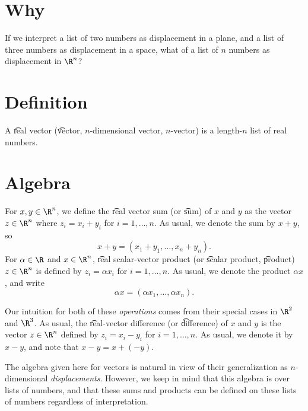 

\section*{Why}

If we interpret a list of two numbers as displacement in a plane, and a list of three numbers as displacement in a space, what of a list of $n$ numbers as displacement in $\R ^n$?

\section*{Definition}

A \t{real vector} (\t{vector}, \t{$n$-dimensional vector}, \t{$n$-vector}) is a length-$n$ list of real numbers.

\section*{Algebra}

For $x, y \in \R ^n$, we define the \t{real vector sum} (or \t{sum}) of $x$ and $y$ as the vector $z \in \R ^n$ where $z_i = x_i + y_i$ for $i = 1, \dots , n$.
As usual, we denote the sum by $x+y$, so
    \[
x + y = (x_1 +y_1, \dots , x_n + y_n).
    \]
For $\alpha  \in \R $ and $x \in \R ^n$, \t{real scalar-vector product} (or \t{scalar product}, \t{product}) $z \in \R ^{n}$ is defined by $z_i = \alpha  x_i$ for $i = 1, \dots , n$.
As usual, we denote the product $\alpha  x$, and write
    \[
\alpha  x = (\alpha  x_1, \dots , \alpha  x_n).
    \]

Our intuition for both of these \textit{operations} comes from their special cases in $\R ^2$ and $\R ^3$.
As usual, the \t{real-vector difference} (or \t{difference}) of $x$ and $y$ is the vector $z \in \R ^{n}$ defined by $z_i = x_i - y_i$ for $i = 1, \dots , n$.
As usual, we denote it by $x - y$, and note that $x - y = x + (-y)$.

The algebra given here for vectors is natural in view of their generalization as $n$-dimensional \textit{displacements}.
However, we keep in mind that this algebra is over lists of numbers, and that these sums and products can be defined on these lists of numbers regardless of interpretation.

\blankpage